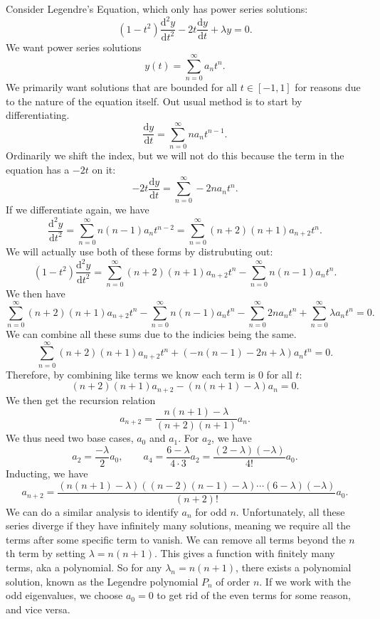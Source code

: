 
Consider Legendre's Equation, which only has power series solutions:
\[
	\left( 1-t^2 \right) \frac{\mathrm{d}^2y}{\mathrm{d}t^2} -2t \frac{\mathrm{d}y}{\mathrm{d}t} +\lambda y=0
.\]
We want power series solutions
\[
	y(t)=\sum_{n=0}^{\infty} a_nt^n
.\]
We primarily want solutions that are bounded for all $t\in [-1,1]$ for reasons due to the nature of the equation itself. Out usual method is to start by differentiating.
\[
	\frac{\mathrm{d}y}{\mathrm{d}t} =\sum_{n=0}^{\infty} na_n t^{n-1}
.\]
Ordinarily we shift the index, but we will not do this because the term in the equation has a $-2t$ on it:
\[
	-2t \frac{\mathrm{d}y}{\mathrm{d}t} =\sum_{n=0}^{\infty} -2na_nt^n
.\]
If we differentiate again, we have
\[
	\frac{\mathrm{d}^2y}{\mathrm{d}t^2} =\sum_{n=0}^{\infty} n\left( n-1 \right) a_nt^{n-2}=\sum_{n=0}^{\infty} \left( n+2 \right) \left( n+1 \right) a_{n+2}t^n
.\]
We will actually use both of these forms by distrubuting out:
\[
	\left( 1-t^2 \right) \frac{\mathrm{d}^2y}{\mathrm{d}t^2} =\sum_{n=0}^{\infty} \left( n+2 \right) \left( n+1 \right) a_{n+2}t^n-\sum_{n=0}^{\infty} n\left( n-1 \right) a_nt^n
.\]
We then have
\[
	\sum_{n=0}^{\infty} \left( n+2 \right) \left( n+1 \right) a_{n+2}t^n-\sum_{n=0}^{\infty} n\left( n-1 \right) a_nt^n-\sum_{n=0}^{\infty} 2na_nt^n+\sum_{n=0}^{\infty} \lambda a_nt^n=0
.\]
We can combine all these sums due to the indicies being the same.
\[
	\sum_{n=0}^{\infty} \left( n+2 \right) \left( n+1 \right) a_{n+2}t^n+\left( -n\left( n-1 \right) -2n+\lambda  \right) a_nt^n=0
.\]
Therefore, by combining like terms we know each term is 0 for all $t$:
\[
	\left( n+2 \right) \left( n+1 \right) a_{n+2}-(n\left( n+1 \right) -\lambda )a_n=0
.\]
We then get the recursion relation
\[
	a_{n+2}=\frac{n\left( n+1 \right) -\lambda }{\left( n+2 \right) \left( n+1 \right) }a_n
.\]
We thus need two base cases, $a_0$ and $a_1$. For $a_2$, we have
\[
	a_2=\frac{-\lambda }{2}a_0,\qquad a_4 = \frac{6-\lambda }{4\cdot 3}a_2=\frac{\left( 2-\lambda  \right) \left( -\lambda  \right) }{4!}a_0
.\]
Inducting, we have
\[
	a_{n+2}=\frac{\left( n(n+1)-\lambda  \right)\left( \left( n-2 \right) \left( n-1 \right) -\lambda  \right) \cdots \left( 6-\lambda  \right) \left( -\lambda  \right)  }{(n+2)!}a_0
.\]
We can do a similar analysis to identify $a_n$ for odd $n$. Unfortunately, all these series diverge if they have infinitely many solutions, meaning we require all the terms after some specific term to vanish. We can remove all terms beyond the $n$ th term by setting $\lambda =n(n+1)$. This gives a function with finitely many terms, aka a polynomial. So for any $\lambda_n = n(n+1)$, there exists a polynomial solution, known as the Legendre polynomial $P_n$ of order $n$. If we work with the odd eigenvalues, we choose $a_0=0$ to get rid of the even terms for some reason, and vice versa.
